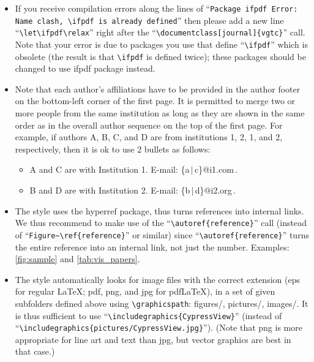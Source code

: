 \documentclass[journal]{vgtc}                %
\begin{document}
\begin{itemize}
	\item If you receive compilation errors along the lines of ``\texttt{Package ifpdf Error: Name clash, \textbackslash ifpdf is already defined}'' then please add a new line ``\texttt{\textbackslash let\textbackslash ifpdf\textbackslash relax}'' right after the ``\texttt{\textbackslash documentclass[journal]\{vgtc\}}'' call.	
		Note that your error is due to packages you use that define ``\texttt{\textbackslash ifpdf}'' which is obsolete (the result is that \texttt{\textbackslash ifpdf} is defined twice); these packages should be changed to use ifpdf package instead.
	
	\item Note that each author's affiliations have to be provided in the author footer on the bottom-left corner of the first page.
		It is permitted to merge two or more people from the same institution as long as they are shown in the same order as in the overall author sequence on the top of the first page.
		For example, if authors A, B, C, and D are from institutions 1, 2, 1, and 2, respectively, then it is ok to use 2 bullets as follows:
		\begin{itemize}		
			\item A and C are with Institution 1. E-mail: \{a\,$|$\,c\}@i1.com\,.
			
			\item B and D are with Institution 2. E-mail: \{b\,$|$\,d\}@i2.org\,.
		\end{itemize}
	
	\item The style uses the hyperref package, thus turns references into internal links.
		We thus recommend to make use of the ``\texttt{\textbackslash autoref\{reference\}}'' call (instead of ``\texttt{Figure\~{}\textbackslash ref\{reference\}}'' or similar) since ``\texttt{\textbackslash autoref\{reference\}}'' turns the entire reference into an internal link, not just the number.
		Examples: \autoref{fig:sample} and \autoref{tab:vis_papers}.
	
	\item The style automatically looks for image files with the correct extension (eps for regular \LaTeX; pdf, png, and jpg for pdf\LaTeX), in a set of given subfolders defined above using \texttt{\textbackslash graphicspath}: figures/, pictures/, images/.
		It is thus sufficient to use ``\texttt{\textbackslash includegraphics\{CypressView\}}'' (instead of ``\texttt{\textbackslash includegraphics\{pictures/CypressView.jpg\}}'').
		(Note that png is more appropriate for line art and text than jpg, but vector graphics are best in that case.)
	

\end{itemize}
\end{document}
